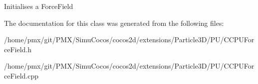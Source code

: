 Initialises a Force\+Field 

The documentation for this class was generated from the following files\+:\begin{DoxyCompactItemize}
\item 
/home/pmx/git/\+P\+M\+X/\+Simu\+Cocos/cocos2d/extensions/\+Particle3\+D/\+P\+U/C\+C\+P\+U\+Force\+Field.\+h\item 
/home/pmx/git/\+P\+M\+X/\+Simu\+Cocos/cocos2d/extensions/\+Particle3\+D/\+P\+U/C\+C\+P\+U\+Force\+Field.\+cpp\end{DoxyCompactItemize}
